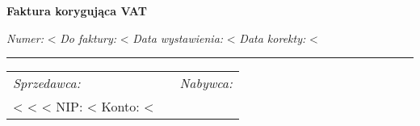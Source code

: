 \documentclass[polish]{dinbrief}
\newcommand{\lyxline}[1][1pt]{%
  \par\noindent%
  \rule[.5ex]{\linewidth}{#1}\par}
\providecommand{\tabularnewline}{\\}
\begin{document}
\begin{flushleft}
\textbf{\Large Faktura korygująca VAT}
\par\end{flushleft}{\Large \par}

\begin{flushleft}
\emph{Numer:} <%
\emph{Do faktury:} <%
\emph{Data wystawienia:} <%
\emph{Data korekty:} <%
\par\end{flushleft}

\begin{flushleft}
\medskip{}

\par\end{flushleft}

\lyxline{\normalsize}


\begin{flushleft}
\begin{tabular}{|l|l|l|}
\cline{1-1} \cline{3-3} 
\emph{Sprzedawca:} &  & \emph{Nabywca:}\tabularnewline
\cline{1-1} \cline{3-3} 
<%
<%
<%
NIP: <%
Konto: <%
\cline{1-1} \cline{3-3} 
\end{tabular}
\par\end{flushleft}

\medskip{}
\end{document}
